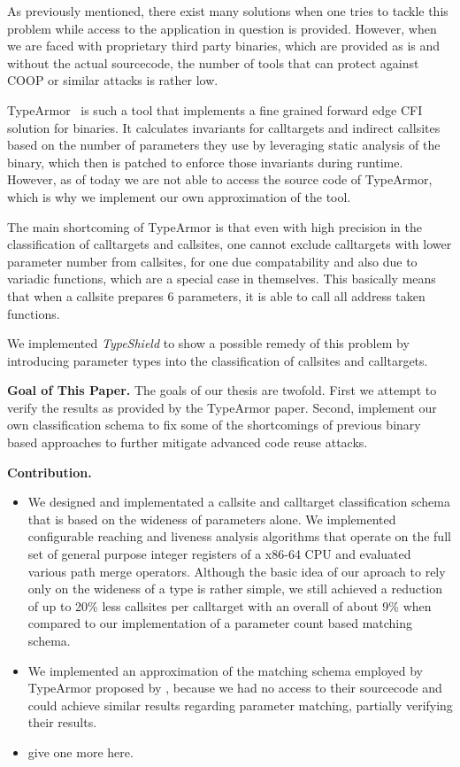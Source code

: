 As previously mentioned, there exist many solutions when one tries to tackle this problem while access to the application in question is provided. However, when we are faced with proprietary third party binaries, which are provided as is and without the actual sourcecode, the number of tools that can protect against COOP or similar attacks is rather low.

TypeArmor~\cite{veen:typearmor} is such a tool that implements a fine grained forward edge CFI solution for binaries. It calculates invariants for calltargets and indirect callsites based on the number of parameters they use by leveraging static analysis of the binary, which then is patched to enforce those invariants during runtime. However, as of today we are not able to access the source code of TypeArmor, which is why we implement our own approximation of the tool.

The main shortcoming of TypeArmor is that even with high precision in the classification of calltargets and callsites, one cannot exclude calltargets with lower parameter number from callsites, for one due compatability and also due to variadic functions, which are a special case in themselves. This basically means that when a callsite prepares 6 parameters, it is able to call all address taken functions.

We implemented \textit{TypeShield} to show a possible remedy of this problem by introducing parameter types into the classification of callsites and calltargets. 

\textbf{Goal of This Paper.} The goals of our thesis are twofold. First we attempt to verify the results as provided by the TypeArmor paper. 
 Second, implement our own classification schema to fix some of the shortcomings of previous binary based approaches 
 to further mitigate advanced code reuse attacks.

 \textbf{Contribution.}
\label{Contribution}
\begin{itemize}
 \item We designed and implementated a callsite and calltarget classification schema
 that is based on the wideness of parameters alone. We implemented configurable reaching and liveness analysis algorithms
 that operate on the full set of general purpose integer registers of a x86-64 CPU and evaluated various path merge operators.
 Although the basic idea of our aproach to rely only on the wideness of a type is rather simple, we still achieved a reduction
 of up to 20\% less callsites per calltarget with an overall of about 9\% when compared to our implementation of a parameter
 count based matching schema.

 \item We implemented an approximation of the matching schema employed by TypeArmor proposed by \cite{veen:typearmor}, 
 because we had no access to their sourcecode and could achieve similar results regarding parameter matching, partially verifying
 their results.
 
 \item give one more here.
  
\end{itemize}


